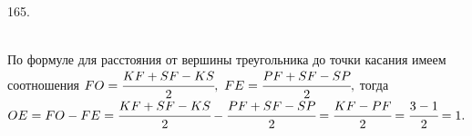 165. \begin{figure}[ht!]
\end{figure}\\
По формуле для расстояния от вершины треугольника до точки касания имеем соотношения $FO=\cfrac{KF+SF-KS}{2},\ FE=\cfrac{PF+SF-SP}{2},$ тогда\\
$OE=FO-FE=\cfrac{KF+SF-KS}{2}-\cfrac{PF+SF-SP}{2}=\cfrac{KF-PF}{2}=\cfrac{3-1}{2}=1.$\\
